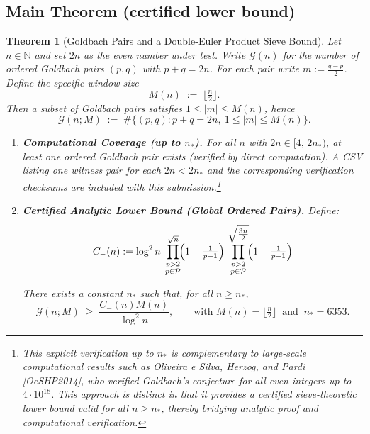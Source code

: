 \documentclass[11pt]{article}
\theoremstyle{inline}
\theoremstyle{break}
\theoremstyle{break}
\theoremstyle{break}
\newtheorem{theorem}{Theorem}
\theoremstyle{break}
\theoremstyle{break}
\theoremstyle{break}
\theoremstyle{break}
\theoremstyle{inline}
\newcommand{\xMertens}{6353} %
\newcommand{\CminusProduct}{C_{-}}
\newcommand{\nprodstar}{n_{\ast}}  %
\begin{document}
\subsection{Main Theorem (certified lower bound)}\label{sec:main-thm}
\begin{theorem}[Goldbach Pairs and a Double-Euler Product Sieve Bound]
\label{thm:main}
Let \(n\in\mathbb{N}\) and set \(2n\) as the even number under test.
Write \(\mathcal{G}(n)\) for the number of \emph{ordered} Goldbach pairs \((p,q)\) with \(p+q=2n\).
For each pair write \(m := \tfrac{q-p}{2}\).
Define the specific window size
\begin{equation}
M(n) \;:=\; \bigl\lfloor \tfrac{n}{2} \bigr\rfloor .
\end{equation}
Then a subset of Goldbach pairs satisfies \(1 \le |m| \le M(n)\), hence
\begin{equation}
\mathcal{G}(n;M) \;:=\; \#\{(p,q): p+q=2n,\ 1\le |m| \le M(n)\}.
\end{equation}

\begin{enumerate}
   \item \textbf{Computational Coverage (up to \(\nprodstar\)).}
   For all \(n\) with \(2n \in [4,\,2\nprodstar)\), at least one ordered Goldbach pair exists
   (verified by direct computation). A CSV listing one witness pair for each \(2n<2\nprodstar\) and the
   corresponding verification checksums are included with this submission.\footnote{This explicit verification up to \( \nprodstar \) is complementary to large-scale computational results such as Oliveira e Silva, Herzog, and Pardi [OeSHP2014], who verified Goldbach’s conjecture for all even integers up to \( 4\cdot 10^{18} \).  This approach is distinct in that it provides a certified sieve-theoretic lower bound valid for all \( n \ge \nprodstar \), thereby bridging analytic proof and computational verification.}

  \item \textbf{Certified Analytic Lower Bound (Global Ordered Pairs).}
  Define:
  \begin{equation}
    \CminusProduct(n) := \log^2{n} \;
      \prod_{\substack{p>2\\ p\in\mathcal{P}}}^{\sqrt{n}}
        \!\Bigl(1-\tfrac{1}{p-1}\Bigr)\,
      \prod_{\substack{p>2\\ p\in\mathcal{P}}}^{\sqrt{\tfrac{3n}{2}}}
        \!\Bigl(1-\tfrac{1}{p-1}\Bigr)
     \label{eq:cminus-product-definition}
   \end{equation}

  There exists a constant \( \nprodstar \) such that, for all \(n \ge \nprodstar\),
  \begin{equation}
    \mathcal{G}(n;M)\;\ge\;\frac{\CminusProduct(n)M(n)}{\log^2 n},
    \qquad
    \text{with } M(n)=\bigl\lfloor \tfrac{n}{2} \bigr\rfloor
    \ \text{ and }\
    \nprodstar=\xMertens .
    \label{eq:analytic-lower-bound-global}
  \end{equation}
\end{enumerate}
\end{theorem}
\end{document}
